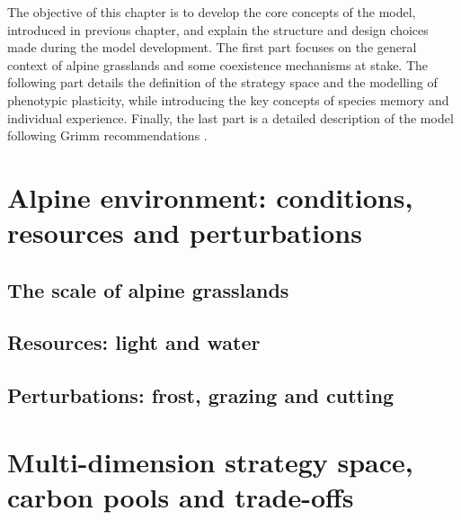 %

The objective of this chapter is to develop the core concepts of the model, introduced in previous chapter, and explain the structure and design choices made during the model development. The first part focuses on the general context of alpine grasslands and some coexistence mechanisms at stake. The following part details the definition of the strategy space and the modelling of phenotypic plasticity, while introducing the key concepts of species memory and individual experience. Finally, the last part is a detailed description of the model following Grimm recommendations \cite{grimm_standard_2006}.

\chapter{Alpine environment: conditions, resources and perturbations}
\section{The scale of alpine grasslands}
\section{Resources: light and water}
\section{Perturbations: frost, grazing and cutting}

\chapter{Multi-dimension strategy space, carbon pools and trade-offs}
